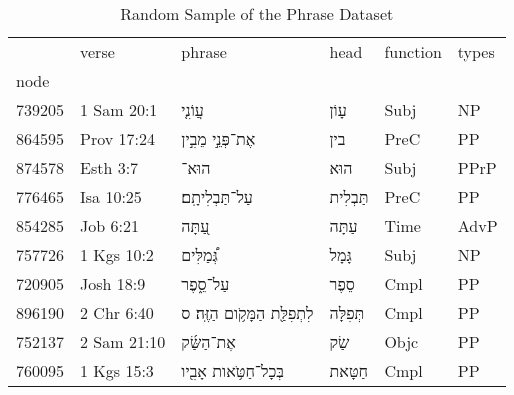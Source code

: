 \begin{table}[htbp!]
\centering
\caption{Random Sample of the Phrase Dataset}
\label{table:sampletable}
\begin{tabular}{llllll}
\toprule
{} &        verse &                                          phrase &                    head & function & types \\
node   &              &                                                 &                         &          &       \\
\midrule
739205 &   1 Sam 20:1 &                           \texthebrew{עֲוֹנִ֤י} &      \texthebrew{עָוֹן} &     Subj &    NP \\
864595 &   Prov 17:24 &                \texthebrew{אֶת־פְּנֵ֣י מֵבִ֣ין} &        \texthebrew{בין} &     PreC &    PP \\
874578 &     Esth 3:7 &                              \texthebrew{הוּא־} &       \texthebrew{הוּא} &     Subj &  PPrP \\
776465 &    Isa 10:25 &                  \texthebrew{עַל־תַּבְלִיתָֽם׃} &  \texthebrew{תַּבְלִית} &     PreC &    PP \\
854285 &     Job 6:21 &                            \texthebrew{עַ֭תָּה} &     \texthebrew{עַתָּה} &     Time &  AdvP \\
757726 &   1 Kgs 10:2 &                        \texthebrew{גְּ֠מַלִּים} &     \texthebrew{גָּמָל} &     Subj &    NP \\
720905 &    Josh 18:9 &                         \texthebrew{עַל־סֵ֑פֶר} &      \texthebrew{סֵפֶר} &     Cmpl &    PP \\
896190 &   2 Chr 6:40 &  \texthebrew{לִתְפִלַּ֖ת הַמָּקֹ֥ום הַזֶּֽה׃ ס} &  \texthebrew{תְּפִלָּה} &     Cmpl &    PP \\
752137 &  2 Sam 21:10 &                       \texthebrew{אֶת־הַשַּׂ֜ק} &       \texthebrew{שַׂק} &     Objc &    PP \\
760095 &   1 Kgs 15:3 &           \texthebrew{בְּכָל־חַטֹּ֥אות אָבִ֖יו} &    \texthebrew{חַטָּאת} &     Cmpl &    PP \\
\bottomrule
\end{tabular}
\end{table}
